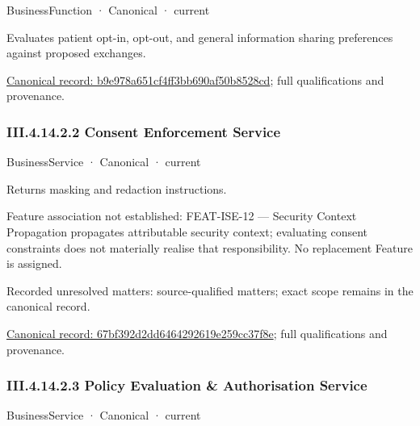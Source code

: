 \label{element:b9e978a651cf4ff3bb690af50b8528cd}
{\small BusinessFunction · Canonical · current}\par

Evaluates patient opt-in, opt-out, and general information sharing preferences against proposed exchanges.


{\footnotesize \href{../../../../../../../../continuum/business/business-function/b9e978a651cf4ff3bb690af50b8528cd.md}{Canonical record: b9e978a651cf4ff3bb690af50b8528cd}; full qualifications and provenance.}\par
\subsubsection*{III.4.14.2.2 Consent Enforcement Service}
\label{navigation:III.4.14.2.2}

\label{element:67bf392d2dd6464292619e259cc37f8e}
{\small BusinessService · Canonical · current}\par

Returns masking and redaction instructions.



Feature association not established: FEAT-ISE-12 — Security Context Propagation propagates attributable security context; evaluating consent constraints does not materially realise that responsibility. No replacement Feature is assigned.


{\small Recorded unresolved matters: source-qualified matters; exact scope remains in the canonical record.}\par
{\footnotesize \href{../../../../../../../../continuum/business/business-service/67bf392d2dd6464292619e259cc37f8e.md}{Canonical record: 67bf392d2dd6464292619e259cc37f8e}; full qualifications and provenance.}\par
\subsubsection*{III.4.14.2.3 Policy Evaluation \& Authorisation Service}
\label{navigation:III.4.14.2.3}

\label{element:a025ac002b6a461abaac07fcb87f411f}
{\small BusinessService · Canonical · current}\par

